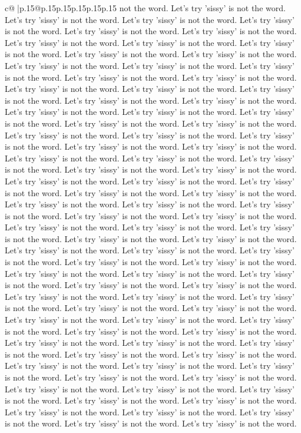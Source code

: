 \documentclass{article}
\begin{document}
{\begin{supertabular}{c@{$\;$}|p{.15\linewidth}@{}p{.15\linewidth}p{.15\linewidth}p{.15\linewidth}p{.15\linewidth}p{.15\linewidth}}
{{{not the word. Let's try 'sissy' is not the word. Let's try 'sissy' is not the word. Let's try 'sissy' is not the word. Let's try 'sissy' is not the word. Let's try 'sissy' is not the word. Let's try 'sissy' is not the word. Let's try 'sissy' is not the word. Let's try 'sissy' is not the word. Let's try 'sissy' is not the word. Let's try 'sissy' is not the word. Let's try 'sissy' is not the word. Let's try 'sissy' is not the word. Let's try 'sissy' is not the word. Let's try 'sissy' is not the word. Let's try 'sissy' is not the word. Let's try 'sissy' is not the word. Let's try 'sissy' is not the word. Let's try 'sissy' is not the word. Let's try 'sissy' is not the word. Let's try 'sissy' is not the word. Let's try 'sissy' is not the word. Let's try 'sissy' is not the word. Let's try 'sissy' is not the word. Let's try 'sissy' is not the word. Let's try 'sissy' is not the word. Let's try 'sissy' is not the word. Let's try 'sissy' is not the word. Let's try 'sissy' is not the word. Let's try 'sissy' is not the word. Let's try 'sissy' is not the word. Let's try 'sissy' is not the word. Let's try 'sissy' is not the word. Let's try 'sissy' is not the word. Let's try 'sissy' is not the word. Let's try 'sissy' is not the word. Let's try 'sissy' is not the word. Let's try 'sissy' is not the word. Let's try 'sissy' is not the word. Let's try 'sissy' is not the word. Let's try 'sissy' is not the word. Let's try 'sissy' is not the word. Let's try 'sissy' is not the word. Let's try 'sissy' is not the word. Let's try 'sissy' is not the word. Let's try 'sissy' is not the word. Let's try 'sissy' is not the word. Let's try 'sissy' is not the word. Let's try 'sissy' is not the word. Let's try 'sissy' is not the word. Let's try 'sissy' is not the word. Let's try 'sissy' is not the word. Let's try 'sissy' is not the word. Let's try 'sissy' is not the word. Let's try 'sissy' is not the word. Let's try 'sissy' is not the word. Let's try 'sissy' is not the word. Let's try 'sissy' is not the word. Let's try 'sissy' is not the word. Let's try 'sissy' is not the word. Let's try 'sissy' is not the word. Let's try 'sissy' is not the word. Let's try 'sissy' is not the word. Let's try 'sissy' is not the word. Let's try 'sissy' is not the word. Let's try 'sissy' is not the word. Let's try 'sissy' is not the word. Let's try 'sissy' is not the word. Let's try 'sissy' is not the word. Let's try 'sissy' is not the word. Let's try 'sissy' is not the word. Let's try 'sissy' is not the word. Let's try 'sissy' is not the word. Let's try 'sissy' is not the word. Let's try 'sissy' is not the word. Let's try 'sissy' is not the word. Let's try 'sissy' is not the word. Let's try 'sissy' is not the word. Let's try 'sissy' is not the word. Let's try 'sissy' is not the word. Let's try 'sissy' is not the word. Let's try 'sissy' is not the word. Let's try 'sissy' is not the word. Let's try 'sissy' is not the word. Let's try 'sissy' is not the word. Let's try 'sissy' is not the word. Let's try 'sissy' is not the word. Let's try 'sissy' is not the word. Let's try 'sissy' is not the word. Let's try 'sissy' is not the word. Let's try 'sissy' is not the word. Let's try 'sissy' is not the word. }}}
\end{supertabular}}
\end{document}
